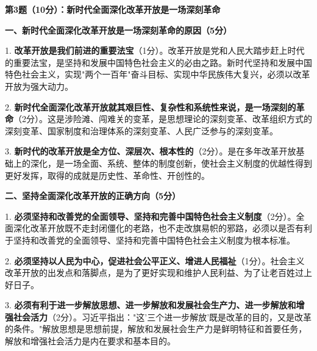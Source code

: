 \documentclass[12pt, a4paper]{article}
\begin{document}
\begin{answerbox}

\textbf{第3题（10分）：新时代全面深化改革开放是一场深刻革命}

\textbf{一、新时代全面深化改革开放是一场深刻革命的原因（5分）}

1. \textbf{改革开放是我们前进的重要法宝}（1分）。改革开放是党和人民大踏步赶上时代的重要法宝，是坚持和发展中国特色社会主义的必由之路。新时代坚持和发展中国特色社会主义，实现"两个一百年"奋斗目标、实现中华民族伟大复兴，必须以改革开放为强大动力。

2. \textbf{新时代全面深化改革开放就其艰巨性、复杂性和系统性来说，是一场深刻的革命}（2分）。这是涉险滩、闯难关的变革，是思想理论的深刻变革、改革组织方式的深刻变革、国家制度和治理体系的深刻变革、人民广泛参与的深刻变革。

3. \textbf{新时代的改革开放是全方位、深层次、根本性的}（2分）。是在多年改革开放基础上的深化，是一场全面、系统、整体的制度创新，使社会主义制度的优越性得到更好发挥，取得的成就是历史性、革命性、开创性的。

\textbf{二、坚持全面深化改革开放的正确方向（5分）}

1. \textbf{必须坚持和改善党的全面领导、坚持和完善中国特色社会主义制度}（2分）。全面深化改革开放既不走封闭僵化的老路，也不走改旗易帜的邪路，必须以是否有利于坚持和改善党的全面领导、坚持和完善中国特色社会主义制度为根本标准。

2. \textbf{必须坚持以人民为中心，促进社会公平正义、增进人民福祉}（1分）。社会主义改革开放的出发点和落脚点，是为了更好实现和维护人民利益、为了让老百姓过上好日子。

3. \textbf{必须有利于进一步解放思想、进一步解放和发展社会生产力、进一步解放和增强社会活力}（2分）。习近平指出："这'三个进一步解放'既是改革的目的，又是改革的条件。"解放思想是思想前提，解放和发展社会生产力是鲜明特征和首要任务，解放和增强社会活力是内在要求和基本目的。

\end{answerbox}

\vspace{6pt}
\end{document}

